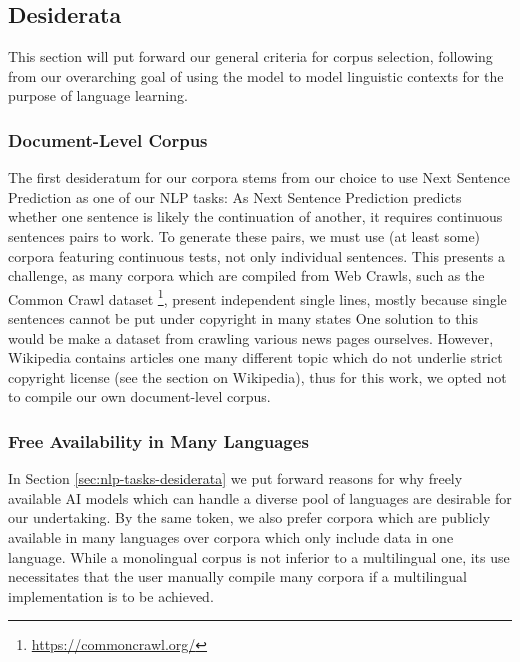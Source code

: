 \subsection{Desiderata}


This section will put forward our general criteria for corpus selection, following from our overarching goal of using the model to model linguistic contexts for the purpose of language learning.


\subsubsection{Document-Level Corpus}
The first desideratum for our corpora stems from our choice to use Next Sentence Prediction as one of our NLP tasks:
As Next Sentence Prediction predicts whether one sentence is likely the continuation of another, it requires continuous sentences pairs to work.
To generate these pairs, we must use (at least some) corpora featuring continuous tests, not only individual sentences.
This presents a challenge, as many corpora which are compiled from Web Crawls, such as the Common Crawl dataset \footnote{\url{https://commoncrawl.org/}}, present independent single lines, mostly because single sentences cannot be put under copyright in many states 
One solution to this would be make a dataset from crawling various news pages ourselves.
However, Wikipedia contains articles one many different topic which do not underlie strict copyright license (see the section on Wikipedia), thus for this work, we opted not to compile our own document-level corpus.

\subsubsection{Free Availability in Many Languages}
In Section \ref{sec:nlp-tasks-desiderata} we put forward reasons for why freely available AI models which can handle a diverse pool of languages are desirable for our undertaking.
By the same token, we also prefer corpora which are publicly available in many languages over corpora which only include data in one language.
While a monolingual corpus is not inferior to a multilingual one, its use necessitates that the user manually compile many corpora if a multilingual implementation is to be achieved.

